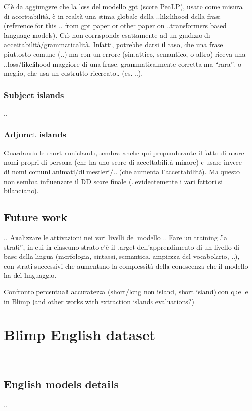 C’è da aggiungere che la loss del modello gpt (score PenLP), usato come misura di accettabilità, è in realtà una stima globale della ..likelihood della frase (reference for this .. from gpt paper or other paper on ..transformers based language models). Ciò non corrisponde esattamente ad un giudizio di accettabilità/grammaticalità. Infatti, potrebbe darsi il caso, che una frase piuttosto comune (..) ma con un errore (sintattico, semantico, o altro) riceva una ..loss/likelihood maggiore di una frase. grammaticalmente corretta ma “rara”, o meglio, che usa un costrutto ricercato.. (es. ..).


\subsubsection{Subject islands}
..

\subsubsection{Adjunct islands}

Guardando le short-nonislands, sembra anche qui preponderante il fatto di usare nomi propri di persona (che ha uno score di accettabilità minore) e usare invece di nomi comuni animati/di mestieri/.. (che aumenta l’accettabilità). Ma questo non sembra influenzare il DD score finale (..evidentemente i vari fattori si bilanciano).


\subsection{Future work}
..
Analizzare le attivazioni nei vari livelli del modello ..
Fare un training .”a strati”, in cui in ciascuno strato c’è il target dell’apprendimento di un livello di base della lingua (morfologia, sintassi, semantica, ampiezza del vocabolario, ..), con strati successivi che aumentano la complessità della conoscenza che il modello ha del linguaggio.


Confronto percentuali accuratezza (short/long non island, short island) con quelle in Blimp
(and other works with extraction islands evaluations?)


\section{Blimp English dataset}
..
\subsection{English models details}
..

